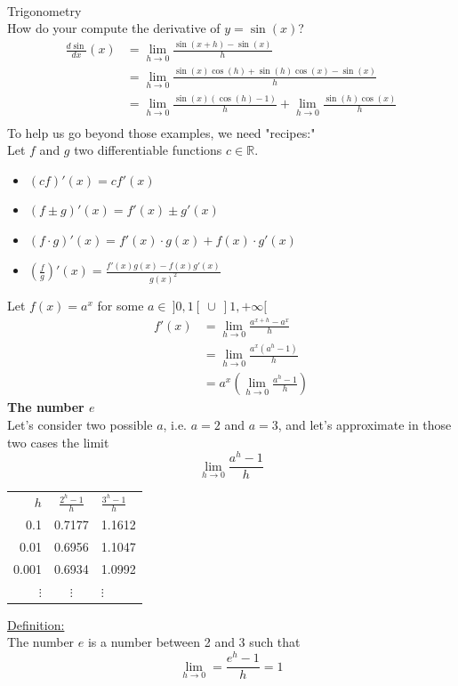 \documentclass[]{article}
\begin{document}
	\pagebreak\\
	\Large{Trigonometry}\\
	\normalsize
	How do your compute the derivative of $y=\sin(x)$?
	\begin{align*}
		\frac{d\sin}{dx}(x)&=\lim_{h\to 0}\frac{\sin(x+h)-\sin(x)}{h}\\
		&=\lim_{h\to 0}\frac{\sin(x)\cos(h)+\sin(h)\cos(x)-\sin(x)}{h}\\
		&=\lim_{h\to 0}\frac{\sin(x)(\cos(h)-1)}{h}+\lim_{h\to 0}\frac{\sin(h)\cos(x)}{h}\\
	\end{align*}
	To help us go beyond those examples, we need "recipes:"\\
	Let $f$ and $g$ two differentiable functions $c\in\mathbb{R}$.
	\begin{itemize}
		\item $(cf)'(x)=cf'(x)$
		\item $(f\pm g)'(x)=f'(x)\pm g'(x)$
		\item $(f\cdot g)'(x)=f'(x)\cdot g(x)+f(x)\cdot g'(x)$
		\item $\left(\frac{f}{g}\right)'(x)=\frac{f'(x)g(x)-f(x)g'(x)}{g(x)^2}$
	\end{itemize}
	Let $f(x)=a^x$ for some $a\in~]0,1[~\cup~]1,+\infty[$
	\begin{align*}
		f'(x)&=\lim_{h\to 0}\frac{a^{x+h}-a^x}{h}\\
		&=\lim_{h\to 0}\frac{a^x(a^h-1)}{h}\\
		&=a^x\left(\lim_{h\to 0}\frac{a^h-1}{h}\right)
	\end{align*}
	\large{\bf The number $e$}\\
	\normalsize
	Let's consider two possible $a$, i.e. $a=2$ and $a=3$, and let's approximate in those two cases the limit
	$$
		\lim_{h\to 0}\frac{a^{h}-1}{h}
	$$
	\begin{center}
		\begin{tabular}{r | c | l}
			{$h$}&{$\frac{2^h-1}{h}$}&{$\frac{3^h-1}{h}$}\\
			{0.1}&{0.7177}&{1.1612}\\
			{0.01}&{0.6956}&{1.1047}\\
			{0.001}&{0.6934}&{1.0992}\\
			{$\vdots$}&{$\vdots$}&{$\vdots$}
		\end{tabular}
	\end{center}
	\underline{Definition:}\\
	The number $e$ is a number between 2 and 3 such that
	$$
		\lim_{h\to 0}=\frac{e^h-1}{h}=1
	$$
\end{document}
